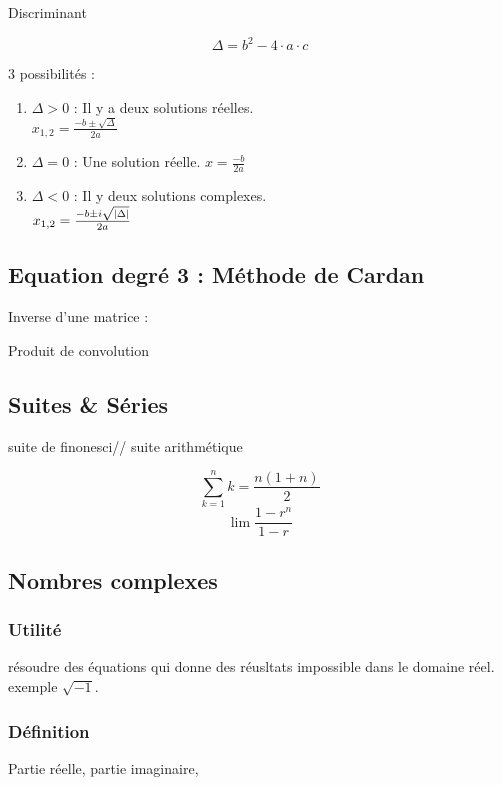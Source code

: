 \documentclass[12pt,a4paper,twoside]{article}
\numberwithin{equation}{subsection}
\DeclarePairedDelimiter{\abs}{\lvert}{\rvert}
\begin{document}
Discriminant

\begin{equation}
\Delta = b^2-4\cdot a \cdot c
\end{equation}

3 possibilités : 

\begin{enumerate}
	\item $\Delta > 0 $ :  Il y a deux solutions réelles.\\ $x_{1,2}=\frac{-b \pm \sqrt{\Delta}}{2 a}$
	\item $\Delta = 0 $ : Une solution réelle.
	$x=\frac{-b}{2 a}$
	\item $\Delta < 0 $ : Il y deux solutions complexes.\\
	$x_{1,2}=\frac{-b\pm i \sqrt{\abs{\Delta}}}{2 a}$
\end{enumerate}
\subsection{Equation degré 3 : Méthode de Cardan}

Inverse d'une matrice :

Produit de convolution

\subsection{Suites \& Séries}

suite de finonesci//
suite arithmétique

\begin{equation}
\sum_{k=1}^{n}k=\frac{n(1+n)}{2}
\end{equation}
\begin{equation}
\lim \frac{1-r^n}{1-r}
\end{equation}

\subsection{Nombres complexes}

\subsubsection{Utilité}
résoudre des équations qui donne des réusltats impossible dans le domaine réel. exemple $\sqrt{-1}$.\\
\subsubsection{Définition}
Partie réelle, partie imaginaire,\\
\end{document}
